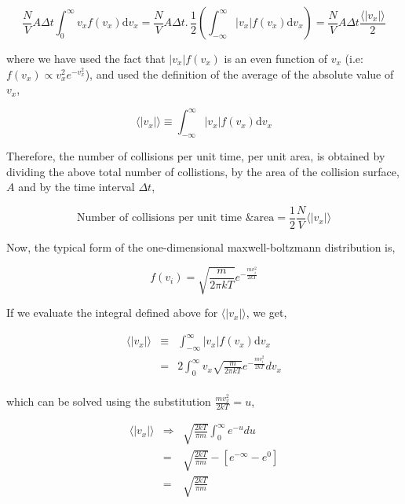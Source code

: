 \documentclass[11pt,a4paper,oneside]{article}
\begin{document}
\begin{equation}
\frac{N}{V}A\Delta t \int_{0}^{\infty} v_{x}f(v_{x})\mathrm{d}v_{x} = \frac{N}{V}A\Delta t . \, \frac{1}{2}\left( \int_{-\infty}^{\infty} |v_{x}|f(v_{x})\mathrm{d}v_{x} \right) = \frac{N}{V}A\Delta t \frac{\langle |v_{x}| \rangle}{2}
\end{equation}

where we have used the fact that $|v_{x}|f(v_{x})$ is an even function of $v_{x}$ (i.e: $f(v_{x}) \propto v_{x}^{2}e^{-v^{2}_{x}}$), and used the definition of the average of the absolute value of $v_{x}$,

\begin{equation}
\langle |v_{x}| \rangle \equiv \int_{-\infty}^{\infty} |v_{x}|f(v_{x})\mathrm{d}v_{x}
\end{equation}

Therefore, the number of collisions per unit time, per unit area, is obtained by dividing the above total number of collistions, by the area of the collision surface, $A$ and by the time interval $\Delta t$, 

\begin{equation}
\mbox{Number of collisions per unit time \& area} = \frac{1}{2}\frac{N}{V} \langle |v_{x}| \rangle
\label{eqn:numbercollisionsperunitareatime}
\end{equation}

Now, the typical form of the one-dimensional maxwell-boltzmann distribution is, 

\begin{equation}
f(v_{i}) = \sqrt{\frac{m}{2\pi k T}} e^{-\frac{mv_{i}^{2}}{2kT}}
\end{equation}

If we evaluate the integral defined above for $\langle |v_{x}| \rangle$, we get,

\begin{eqnarray*}
\langle |v_{x}| \rangle &\equiv& \int_{-\infty}^{\infty} |v_{x}|f(v_{x})\mathrm{d}v_{x} \\
&=& 2\int_{0}^{\infty} v_{x} \sqrt{\frac{m}{2\pi k T}} e^{-\frac{mv_{i}^{2}}{2kT}}  dv_{x} \\
\end{eqnarray*}

which can be solved using the substitution $\frac{mv_{x}^{2}}{2kT} = u$, 

\begin{eqnarray*}
\langle |v_{x}| \rangle &\Rightarrow& \sqrt{\frac{2kT}{\pi m}} \int_{0}^{\infty} e^{-u} du \\
&=& \sqrt{\frac{2kT}{\pi m}} -\left[e^{-\infty} - e^{0}\right] \\
&=& \sqrt{\frac{2kT}{\pi m}}
\end{eqnarray*}
\end{document}
